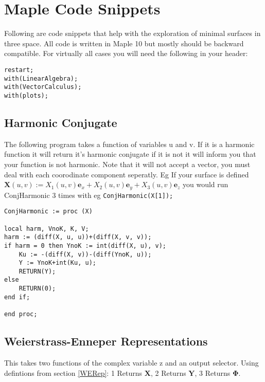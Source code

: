 \newpage
\appendix

\section{Maple Code Snippets}

Following are code snippets that help with the exploration of minimal surfaces in three space. All code is written in Maple 10 but mostly should be backward compatible. For virtually all cases you will need the following in your header:

\begin{verbatim}
restart;
with(LinearAlgebra);
with(VectorCalculus);
with(plots);
\end{verbatim}

\subsection{Harmonic Conjugate}
The following program takes a function of variables u and v. If it is a harmonic function it will return it's harmonic conjugate if it is not it will inform you that your function is not harmonic. Note that it will not accept a vector, you must deal with each coorodinate component seperatly. Eg If your surface is defined $\mathbf X(u,v) := X_1(u,v) \mathbf e_x + X_2(u,v) \mathbf e_y + X_3(u,v) \mathbf e_z$ you would run ConjHarmonic 3 times with eg \verb|ConjHarmonic(X[1]);|

\begin{verbatim}
ConjHarmonic := proc (X) 
    
local harm, VnoK, K, V; 
harm := (diff(X, u, u))+(diff(X, v, v)); 
if harm = 0 then YnoK := int(diff(X, u), v); 
	Ku := -(diff(X, v))-(diff(YnoK, u)); 
	Y := YnoK+int(Ku, u); 
	RETURN(Y);
else 
	RETURN(0);
end if; 
    
end proc;
\end{verbatim}

\newpage

\subsection{Weierstrass-Enneper Representations}
This takes two functions of the complex variable z and an output selector. Using defintions from section \ref{WERep}: 1 Returns $\mathbf X$, 2 Returns $\mathbf Y$, 3 Returns $\mathbf \Phi$. 

